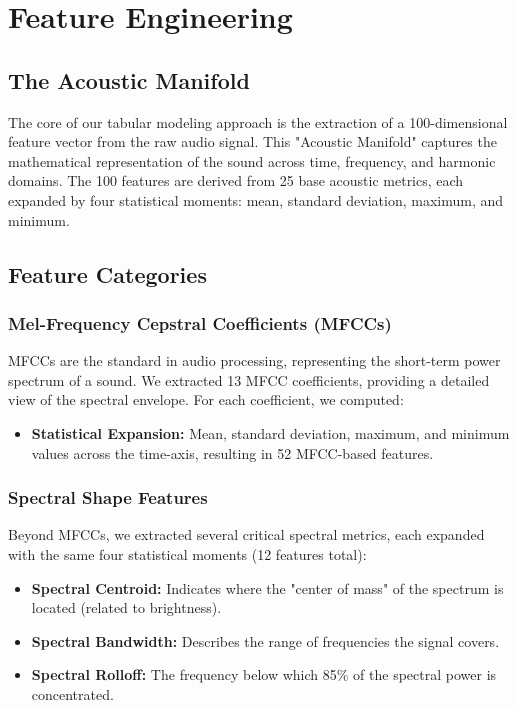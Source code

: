 \chapter{Feature Engineering}

\section{The Acoustic Manifold}
The core of our tabular modeling approach is the extraction of a 100-dimensional feature vector from the raw audio signal. This "Acoustic Manifold" captures the mathematical representation of the sound across time, frequency, and harmonic domains. The 100 features are derived from 25 base acoustic metrics, each expanded by four statistical moments: mean, standard deviation, maximum, and minimum.

\section{Feature Categories}

\subsection{Mel-Frequency Cepstral Coefficients (MFCCs)}
MFCCs are the standard in audio processing, representing the short-term power spectrum of a sound. We extracted 13 MFCC coefficients, providing a detailed view of the spectral envelope. For each coefficient, we computed:
\begin{itemize}
    \item \textbf{Statistical Expansion:} Mean, standard deviation, maximum, and minimum values across the time-axis, resulting in 52 MFCC-based features.
\end{itemize}

\subsection{Spectral Shape Features}
Beyond MFCCs, we extracted several critical spectral metrics, each expanded with the same four statistical moments (12 features total):
\begin{itemize}
    \item \textbf{Spectral Centroid:} Indicates where the "center of mass" of the spectrum is located (related to brightness).
    \item \textbf{Spectral Bandwidth:} Describes the range of frequencies the signal covers.
    \item \textbf{Spectral Rolloff:} The frequency below which 85\% of the spectral power is concentrated.
\end{itemize}

